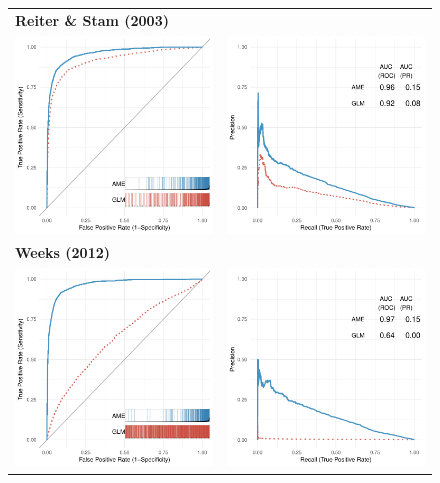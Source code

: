 \begin{figure}
	\centering   
	\begin{tabular}{cc}
		\multicolumn{2}{l}{\textbf{Reiter \& Stam (2003)}} \\
		\includegraphics[width=.4\textwidth]{graphics/reiter_stam_roc_outSample.pdf} & 
		\includegraphics[width=.4\textwidth]{graphics/reiter_stam_pr_outSample.pdf} \\
		\multicolumn{2}{l}{\textbf{Weeks (2012)}} \\
		\includegraphics[width=.4\textwidth]{graphics/weeks_roc_outSample.pdf} & 
		\includegraphics[width=.4\textwidth]{graphics/weeks_pr_outSample.pdf} \\

\end{tabular}
\end{figure}
